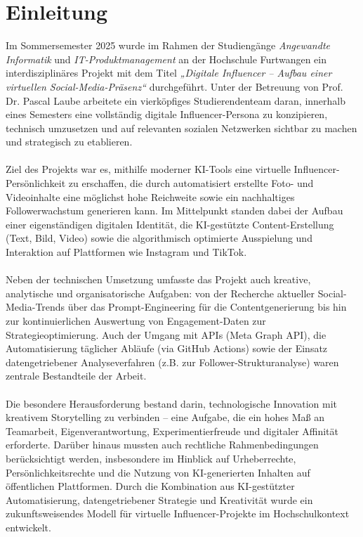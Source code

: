 \documentclass[a4paper,12pt]{article}
\begin{document}
\section{Einleitung}
Im Sommersemester 2025 wurde im Rahmen der Studiengänge \textit{Angewandte Informatik} und \textit{IT-Produktmanagement} an der Hochschule Furtwangen ein interdisziplinäres Projekt mit dem Titel \textit{„Digitale Influencer – Aufbau einer virtuellen Social-Media-Präsenz“} durchgeführt. Unter der Betreuung von Prof. Dr. Pascal Laube arbeitete ein vierköpfiges Studierendenteam daran, innerhalb eines Semesters eine vollständig digitale Influencer-Persona zu konzipieren, technisch umzusetzen und auf relevanten sozialen Netzwerken sichtbar zu machen und strategisch zu etablieren. \\\\
Ziel des Projekts war es, mithilfe moderner KI-Tools eine virtuelle Influencer-Persönlichkeit zu erschaffen, die durch automatisiert erstellte Foto- und Videoinhalte eine möglichst hohe Reichweite sowie ein nachhaltiges Followerwachstum generieren kann. Im Mittelpunkt standen dabei der Aufbau einer eigenständigen digitalen Identität, die KI-gestützte Content-Erstellung (Text, Bild, Video) sowie die algorithmisch optimierte Ausspielung und Interaktion auf Plattformen wie Instagram und TikTok.\\\\
Neben der technischen Umsetzung umfasste das Projekt auch kreative, analytische und organisatorische Aufgaben: von der Recherche aktueller Social-Media-Trends über das Prompt-Engineering für die Contentgenerierung bis hin zur kontinuierlichen Auswertung von Engagement-Daten zur Strategieoptimierung. Auch der Umgang mit APIs (Meta Graph API), die Automatisierung täglicher Abläufe (via GitHub Actions) sowie der Einsatz datengetriebener Analyseverfahren (z.B. zur Follower-Strukturanalyse) waren zentrale Bestandteile der Arbeit.\\\\
Die besondere Herausforderung bestand darin, technologische Innovation mit kreativem Storytelling zu verbinden – eine  Aufgabe, die ein hohes Maß an Teamarbeit, Eigenverantwortung, Experimentierfreude und digitaler Affinität erforderte. Darüber hinaus mussten auch rechtliche Rahmenbedingungen berücksichtigt werden, insbesondere im Hinblick auf Urheberrechte, Persönlichkeitsrechte und die Nutzung von KI-generierten Inhalten auf öffentlichen Plattformen. Durch die Kombination aus KI-gestützter Automatisierung, datengetriebener Strategie und Kreativität wurde ein zukunftsweisendes Modell für virtuelle Influencer-Projekte im Hochschulkontext entwickelt.
\end{document}
